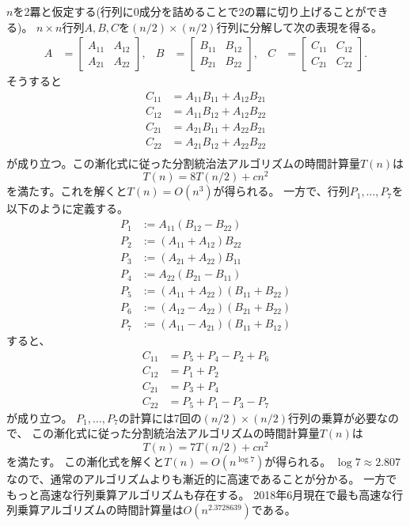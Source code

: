 \documentclass[a4paper,twoside,onecolumn,openany,article,10pt]{memoir}
\theoremstyle{definition}
\theoremstyle{remark}
\begin{document}
$n$を2羃と仮定する(行列に0成分を詰めることで2の羃に切り上げることができる)。
$n\times n$行列$A, B, C$を$(n/2)\times (n/2)$行列に分解して次の表現を得る。
\begin{align*}
A&=\begin{bmatrix}
A_{11}& A_{12}\\
A_{21}& A_{22}
\end{bmatrix},&
B&=\begin{bmatrix}
B_{11}& B_{12}\\
B_{21}& B_{22}
\end{bmatrix},&
C&=\begin{bmatrix}
C_{11}& C_{12}\\
C_{21}& C_{22}
\end{bmatrix}.
\end{align*}
そうすると
\begin{align*}
C_{11} &= A_{11}B_{11} + A_{12}B_{21}\\
C_{12} &= A_{11}B_{12} + A_{12}B_{22}\\
C_{21} &= A_{21}B_{11} + A_{22}B_{21}\\
C_{22} &= A_{21}B_{12} + A_{22}B_{22}\\
\end{align*}
が成り立つ。この漸化式に従った分割統治法アルゴリズムの時間計算量$T(n)$は
\begin{equation*}
T(n) = 8T(n/2) + cn^2
\end{equation*}
を満たす。これを解くと$T(n)=O(n^3)$が得られる。
一方で、行列$P_1,\dotsc,P_7$を以下のように定義する。
\begin{align*}
P_1 &:= A_{11}(B_{12}-B_{22})\\
P_2 &:= (A_{11}+A_{12})B_{22}\\
P_3 &:= (A_{21}+A_{22})B_{11}\\
P_4 &:= A_{22}(B_{21}-B_{11})\\
P_5 &:= (A_{11}+A_{22})(B_{11}+B_{22})\\
P_6 &:= (A_{12}-A_{22})(B_{21}+B_{22})\\
P_7 &:= (A_{11}-A_{21})(B_{11}+B_{12})
\end{align*}
すると、
\begin{align*}
C_{11} &=P_5+P_4-P_2+P_6\\
C_{12} &=P_1+P_2\\
C_{21} &=P_3+P_4\\
C_{22} &=P_5+P_1-P_3-P_7
\end{align*}
が成り立つ。
$P_1,\dotsc,P_7$の計算には7回の$(n/2)\times(n/2)$行列の乗算が必要なので、
この漸化式に従った分割統治法アルゴリズムの時間計算量$T(n)$は
\begin{equation*}
T(n) = 7T(n/2) + cn^2
\end{equation*}
を満たす。
この漸化式を解くと$T(n)=O(n^{\log 7})$が得られる。
$\log 7 \approx 2.807$なので、通常のアルゴリズムよりも漸近的に高速であることが分かる。
一方でもっと高速な行列乗算アルゴリズムも存在する。
2018年6月現在で最も高速な行列乗算アルゴリズムの時間計算量は$O(n^{2.3728639})$である。
\end{document}
